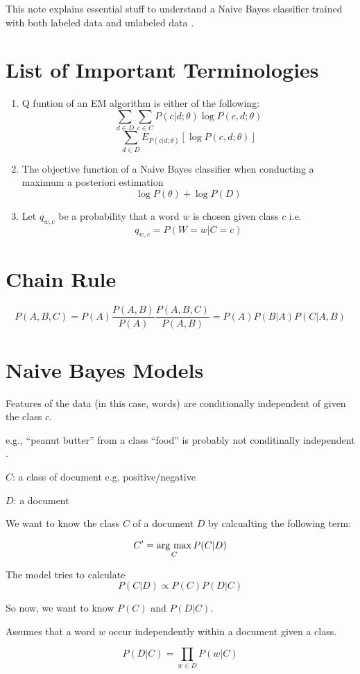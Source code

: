 \documentclass[11pt]{article}
\newcommand{\argmax}{\mathop{\rm arg~max}\limits}
\begin{document}
This note explains essential stuff to understand a Naive Bayes classifier trained with both labeled data and unlabeled data \cite{nigam2000text,Takamura2010}.


\section{List of Important Terminologies}
\begin{enumerate}
 \item Q funtion of an EM algorithm is either of the following:
$$\sum_{d \in D} \sum_{c \in C} P(c|d; \theta) \log P(c, d; \theta)$$
$$\sum_{d \in D} E_{P(c|d; \theta)}[ \log P(c, d; \theta)]$$
 \item The objective function of a Naive Bayes classifier when conducting a maximum a posteriori estimation 
$$\log P(\theta) + \log P(D)$$
\item Let $q_{w,c}$ be a probability that a word $w$ is chosen given class $c$ i.e.
$$q_{w,c} = P(W = w | C = c)$$
\end{enumerate}

\section{Chain Rule}
$$
P(A, B, C) = P(A) \frac{P(A, B)}{P(A)} \frac{P(A, B, C)}{P(A, B)} = P(A)P(B|A)P(C|A,B)
$$

\section{Naive Bayes Models}
Features of the data (in this case, words) are conditionally independent of given the class $c$.

e.g., ``peanut butter'' from a class ``food'' is probably not conditinally independent \cite{naive_bayes_lecture}.

$C$: a class of document e.g. positive/negative

$D$: a document

We want to know the class $C$ of a document $D$ by calcualting the following term:

$$C' = \argmax_{C} P(C|D)$$

The model tries to calculate
$$P(C|D) \propto P(C) P(D|C)$$

So now, we want to know $P(C)$ and $P(D|C)$.

Assumes that a word $w$ occur independently within a document given a class.

$$P(D|C) = \prod_{w \in D} P(w|C)$$
\end{document}

